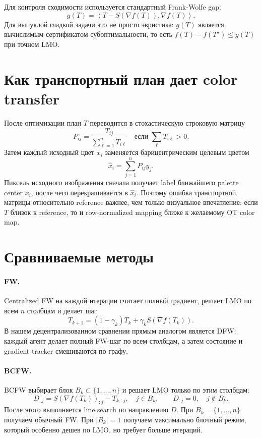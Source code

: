 \documentclass[11pt,a4paper]{article}
\newcommand{\1}{\mathbf{1}}
\newcommand{\inner}[2]{\left\langle #1,#2\right\rangle}
\begin{document}
Для контроля сходимости используется стандартный Frank-Wolfe gap:
\begin{equation}
\label{eq:gap}
  g(T)
  =
  \inner{T-S(\nabla f(T))}{\nabla f(T)}.
\end{equation}
Для выпуклой гладкой задачи это не просто эвристика: $g(T)$ является вычислимым сертификатом субоптимальности, то есть $f(T)-f(T^\star)\le g(T)$ при точном LMO.

\section{Как транспортный план дает color transfer}

После оптимизации план $T$ переводится в стохастическую строковую матрицу
\[
  P_{ij}
  =
  \frac{T_{ij}}{\sum_{\ell=1}^{n} T_{i\ell}}
  \quad
  \text{если } \sum_{\ell}T_{i\ell}>0.
\]
Затем каждый исходный цвет $x_i$ заменяется барицентрическим целевым цветом
\[
  \hat{x}_i = \sum_{j=1}^{n} P_{ij}y_j.
\]
Пиксель исходного изображения сначала получает label ближайшего palette center $x_i$, после чего перекрашивается в $\hat{x}_i$. Поэтому ошибка транспортной матрицы относительно reference важнее, чем только визуальное впечатление: если $T$ близок к reference, то и row-normalized mapping ближе к желаемому OT color map.

\section{Сравниваемые методы}

\paragraph{FW.}
Centralized FW на каждой итерации считает полный градиент, решает LMO по всем $n$ столбцам и делает шаг
\[
  T_{k+1}=(1-\gamma_k)T_k+\gamma_k S(\nabla f(T_k)).
\]
В нашем децентрализованном сравнении прямым аналогом является DFW: каждый агент делает полный FW-шаг по всем столбцам, а затем состояние и gradient tracker смешиваются по графу.

\paragraph{BCFW.}
BCFW выбирает блок $B_k\subset\{1,\ldots,n\}$ и решает LMO только по этим столбцам:
\[
  D_{:j}=S(\nabla f(T_k))_{:j}-T_{k,:j},\quad j\in B_k,
  \qquad
  D_{:j}=0,\quad j\notin B_k.
\]
После этого выполняется line search по направлению $D$. При $B_k=\{1,\ldots,n\}$ получаем обычный FW. При $|B_k|=1$ получаем максимально блочный режим, который особенно дешев по LMO, но требует больше итераций.
\end{document}

